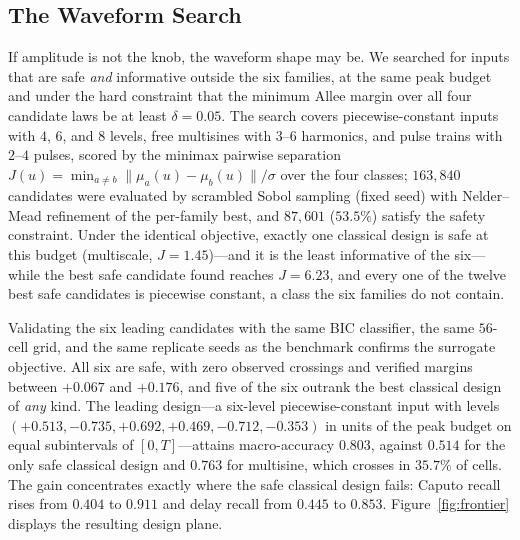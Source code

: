 \documentclass[mathematics,article,accept,pdftex,moreauthors]{Definitions/mdpi}
\begin{document}
\subsection{The Waveform Search}
\label{sec:search}

If amplitude is not the knob, the waveform shape may be. We searched for inputs that are safe \emph{and} informative outside the six families, at the same peak budget and under the hard constraint that the minimum Allee margin over all four candidate laws be at least $\delta=0.05$. The search covers piecewise-constant inputs with $4$, $6$, and $8$ levels, free multisines with $3$--$6$ harmonics, and pulse trains with $2$--$4$ pulses, scored by the minimax pairwise separation $J(u)=\min_{a\neq b}\|\mu_{a}(u)-\mu_{b}(u)\|/\sigma$ over the four classes; $163{,}840$ candidates were evaluated by scrambled Sobol sampling (fixed seed) with Nelder--Mead refinement of the per-family best, and $87{,}601$ ($53.5\%$) satisfy the safety constraint. Under the identical objective, exactly one classical design is safe at this budget (multiscale, $J=1.45$)---and it is the least informative of the six---while the best safe candidate found reaches $J=6.23$, and every one of the twelve best safe candidates is piecewise constant, a class the six families do not contain.

Validating the six leading candidates with the same BIC classifier, the same $56$-cell grid, and the same replicate seeds as the benchmark confirms the surrogate objective. All six are safe, with zero observed crossings and verified margins between $+0.067$ and $+0.176$, and five of the six outrank the best classical design of \emph{any} kind. The leading design---a six-level piecewise-constant input with levels $(+0.513,-0.735,+0.692,+0.469,-0.712,-0.353)$ in units of the peak budget on equal subintervals of $[0,T]$---attains macro-accuracy $0.803$, against $0.514$ for the only safe classical design and $0.763$ for multisine, which crosses in $35.7\%$ of cells. The gain concentrates exactly where the safe classical design fails: Caputo recall rises from $0.404$ to $0.911$ and delay recall from $0.445$ to $0.853$. Figure~\ref{fig:frontier} displays the resulting design plane.
\end{document}
